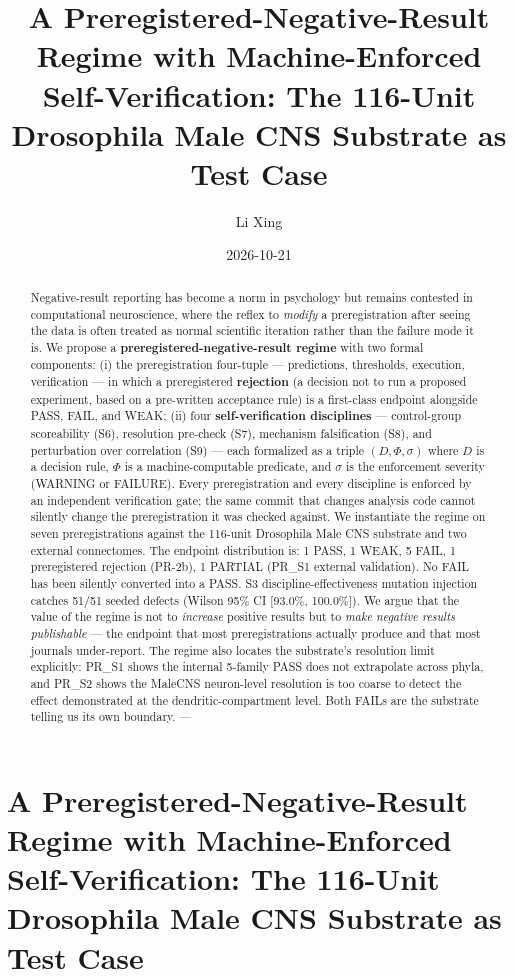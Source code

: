 \documentclass[
]{article}
\title{A Preregistered-Negative-Result Regime with Machine-Enforced
Self-Verification: The 116-Unit Drosophila Male CNS Substrate as Test
Case}
\author{Li Xing}
\date{2026-10-21}
\begin{document}
\maketitle
\begin{abstract}
Negative-result reporting has become a norm in psychology but remains
contested in computational neuroscience, where the reflex to
\emph{modify} a preregistration after seeing the data is often treated
as normal scientific iteration rather than the failure mode it is. We
propose a \textbf{preregistered-negative-result regime} with two formal
components: (i) the preregistration four-tuple --- predictions,
thresholds, execution, verification --- in which a preregistered
\textbf{rejection} (a decision not to run a proposed experiment, based
on a pre-written acceptance rule) is a first-class endpoint alongside
PASS, FAIL, and WEAK; (ii) four \textbf{self-verification disciplines}
--- control-group scoreability (S6), resolution pre-check (S7),
mechanism falsification (S8), and perturbation over correlation (S9) ---
each formalized as a triple \((D, \Phi, \sigma)\) where \(D\) is a
decision rule, \(\Phi\) is a machine-computable predicate, and
\(\sigma\) is the enforcement severity (WARNING or FAILURE). Every
preregistration and every discipline is enforced by an independent
verification gate; the same commit that changes analysis code cannot
silently change the preregistration it was checked against. We
instantiate the regime on seven preregistrations against the 116-unit
Drosophila Male CNS substrate and two external connectomes. The endpoint
distribution is: 1 PASS, 1 WEAK, 5 FAIL, 1 preregistered rejection
(PR-2b), 1 PARTIAL (PR\_S1 external validation). No FAIL has been
silently converted into a PASS. S3 discipline-effectiveness mutation
injection catches 51/51 seeded defects (Wilson 95\% CI {[}93.0\%,
100.0\%{]}). We argue that the value of the regime is not to
\emph{increase} positive results but to \emph{make negative results
publishable} --- the endpoint that most preregistrations actually
produce and that most journals under-report. The regime also locates the
substrate's resolution limit explicitly: PR\_S1 shows the internal
5-family PASS does not extrapolate across phyla, and PR\_S2 shows the
MaleCNS neuron-level resolution is too coarse to detect the effect \citet{ref35} demonstrated at the dendritic-compartment level. Both FAILs
are the substrate telling us its own boundary. ---
\end{abstract}

{
\setcounter{tocdepth}{3}
\tableofcontents
}
\section{A Preregistered-Negative-Result Regime with Machine-Enforced
Self-Verification: The 116-Unit Drosophila Male CNS Substrate as Test
Case}\label{a-preregistered-negative-result-regime-with-machine-enforced-self-verification-the-116-unit-drosophila-male-cns-substrate-as-test-case}
\end{document}

